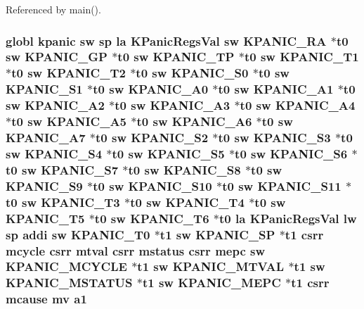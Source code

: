 Referenced by main().

\hypertarget{riscv_2atomic_8S_a722b1add1d9781e2115fb2fcc9d5541a}{
\subsubsection[{a1}]{\setlength{\rightskip}{0pt plus 5cm}globl {\bf kpanic} {\bf sw} {\bf sp} {\bf la} {\bf K\-Panic\-Regs\-Val} {\bf sw} {\bf K\-P\-A\-N\-I\-C\-\_\-\-R\-A} $\ast${\bf t0} {\bf sw} {\bf K\-P\-A\-N\-I\-C\-\_\-\-G\-P} $\ast${\bf t0} {\bf sw} {\bf K\-P\-A\-N\-I\-C\-\_\-\-T\-P} $\ast${\bf t0} {\bf sw} {\bf K\-P\-A\-N\-I\-C\-\_\-\-T1} $\ast${\bf t0} {\bf sw} {\bf K\-P\-A\-N\-I\-C\-\_\-\-T2} $\ast${\bf t0} {\bf sw} {\bf K\-P\-A\-N\-I\-C\-\_\-\-S0} $\ast${\bf t0} {\bf sw} {\bf K\-P\-A\-N\-I\-C\-\_\-\-S1} $\ast${\bf t0} {\bf sw} {\bf K\-P\-A\-N\-I\-C\-\_\-\-A0} $\ast${\bf t0} {\bf sw} {\bf K\-P\-A\-N\-I\-C\-\_\-\-A1} $\ast${\bf t0} {\bf sw} {\bf K\-P\-A\-N\-I\-C\-\_\-\-A2} $\ast${\bf t0} {\bf sw} {\bf K\-P\-A\-N\-I\-C\-\_\-\-A3} $\ast${\bf t0} {\bf sw} {\bf K\-P\-A\-N\-I\-C\-\_\-\-A4} $\ast${\bf t0} {\bf sw} {\bf K\-P\-A\-N\-I\-C\-\_\-\-A5} $\ast${\bf t0} {\bf sw} {\bf K\-P\-A\-N\-I\-C\-\_\-\-A6} $\ast${\bf t0} {\bf sw} {\bf K\-P\-A\-N\-I\-C\-\_\-\-A7} $\ast${\bf t0} {\bf sw} {\bf K\-P\-A\-N\-I\-C\-\_\-\-S2} $\ast${\bf t0} {\bf sw} {\bf K\-P\-A\-N\-I\-C\-\_\-\-S3} $\ast${\bf t0} {\bf sw} {\bf K\-P\-A\-N\-I\-C\-\_\-\-S4} $\ast${\bf t0} {\bf sw} {\bf K\-P\-A\-N\-I\-C\-\_\-\-S5} $\ast${\bf t0} {\bf sw} {\bf K\-P\-A\-N\-I\-C\-\_\-\-S6} $\ast${\bf t0} {\bf sw} {\bf K\-P\-A\-N\-I\-C\-\_\-\-S7} $\ast${\bf t0} {\bf sw} {\bf K\-P\-A\-N\-I\-C\-\_\-\-S8} $\ast${\bf t0} {\bf sw} {\bf K\-P\-A\-N\-I\-C\-\_\-\-S9} $\ast${\bf t0} {\bf sw} {\bf K\-P\-A\-N\-I\-C\-\_\-\-S10} $\ast${\bf t0} {\bf sw} {\bf K\-P\-A\-N\-I\-C\-\_\-\-S11} $\ast${\bf t0} {\bf sw} {\bf K\-P\-A\-N\-I\-C\-\_\-\-T3} $\ast${\bf t0} {\bf sw} {\bf K\-P\-A\-N\-I\-C\-\_\-\-T4} $\ast${\bf t0} {\bf sw} {\bf K\-P\-A\-N\-I\-C\-\_\-\-T5} $\ast${\bf t0} {\bf sw} {\bf K\-P\-A\-N\-I\-C\-\_\-\-T6} $\ast${\bf t0} {\bf la} {\bf K\-Panic\-Regs\-Val} {\bf lw} {\bf sp} addi {\bf sw} {\bf K\-P\-A\-N\-I\-C\-\_\-\-T0} $\ast${\bf t1} {\bf sw} {\bf K\-P\-A\-N\-I\-C\-\_\-\-S\-P} $\ast${\bf t1} csrr mcycle csrr mtval csrr {\bf mstatus} csrr {\bf mepc} {\bf sw} {\bf K\-P\-A\-N\-I\-C\-\_\-\-M\-C\-Y\-C\-L\-E} $\ast${\bf t1} {\bf sw} {\bf K\-P\-A\-N\-I\-C\-\_\-\-M\-T\-V\-A\-L} $\ast${\bf t1} {\bf sw} {\bf K\-P\-A\-N\-I\-C\-\_\-\-M\-S\-T\-A\-T\-U\-S} $\ast${\bf t1} {\bf sw} {\bf K\-P\-A\-N\-I\-C\-\_\-\-M\-E\-P\-C} $\ast${\bf t1} csrr mcause mv a1}}\label{riscv_2atomic_8S_a722b1add1d9781e2115fb2fcc9d5541a}



